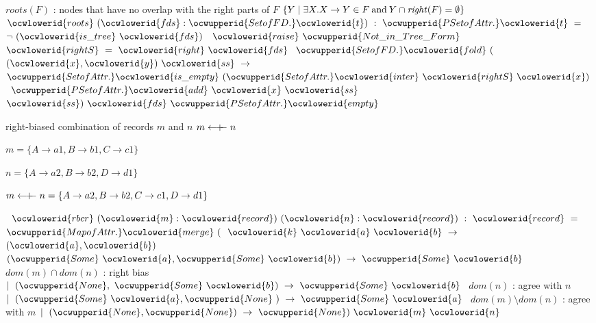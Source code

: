 \documentclass[12pt]{article}
\begin{document}
\ocwendcode{}\ocwindent{0.00em}
$roots(F)$ : nodes that have no overlap with the right parts of $F$ 
\ocweol
\ocwindent{0.00em}
$\{ Y \mid \exists X.X\to Y\in F \mathbin{\text{and}} Y \cap \mathit{right}(F)=\emptyset \}$ 
\ocweol
\label{rellens.ml:13759}%
\medskip
\ocwbegincode{}\ocwindent{0.00em}
~$\ocwlowerid{roots}~(\ocwlowerid{fds}:\ocwupperid{SetofFD.}\ocwlowerid{t})~:~\ocwupperid{PSetofAttr.}\ocwlowerid{t}~=$\ocweol
\ocwindent{1.50em}
~$\lnot{}~(\ocwlowerid{is\_tree}~\ocwlowerid{fds})~$~$\ocwlowerid{raise}~\ocwupperid{Not\_in\_Tree\_Form}~$\ocweol
\ocwindent{1.50em}
~$\ocwlowerid{rightS}~=~\ocwlowerid{right}~\ocwlowerid{fds}~$\ocweol
\ocwindent{1.50em}
$\ocwupperid{SetofFD.}\ocwlowerid{fold}~($~$(\ocwlowerid{x},\ocwlowerid{y})~\ocwlowerid{ss}~\rightarrow{}$\ocweol
\ocwindent{2.50em}
~$\ocwupperid{SetofAttr.}\ocwlowerid{is\_empty}~(\ocwupperid{SetofAttr.}\ocwlowerid{inter}~\ocwlowerid{rightS}~\ocwlowerid{x})~$\ocweol
\ocwindent{2.50em}
~$\ocwupperid{PSetofAttr.}\ocwlowerid{add}~\ocwlowerid{x}~\ocwlowerid{ss}~$\ocweol
\ocwindent{4.50em}
~$\ocwlowerid{ss})~\ocwlowerid{fds}~\ocwupperid{PSetofAttr.}\ocwlowerid{empty}$\medskip

\ocwendcode{}\ocwindent{0.00em}
right-biased combination of records $m$ and $n$ 
\ocweol
\ocwindent{0.00em}
$m \mathrel{\leftarrow\mkern-7mu+\mkern-7mu-} n$

  $m =          \{ A \to a1, B \to b1, C \to c1\}$

  $n =          \{ A \to a2, B \to b2,          D \to d1\}$

  $m \mathrel{\leftarrow\mkern-7mu+\mkern-7mu-} n  = \{ A \to a2, B \to b2, C \to c1,D \to d1\}$

 
\ocweol
\label{rellens.ml:14545}%
\medskip
\ocwbegincode{}\ocwindent{0.00em}
~$\ocwlowerid{rbcr}~(\ocwlowerid{m}:\ocwlowerid{record})~(\ocwlowerid{n}:\ocwlowerid{record})~:~\ocwlowerid{record}~=~$\ocweol
\ocwindent{1.00em}
$\ocwupperid{MapofAttr.}\ocwlowerid{merge}~($~$\ocwlowerid{k}~\ocwlowerid{a}~\ocwlowerid{b}~\rightarrow{}~$~$(\ocwlowerid{a},\ocwlowerid{b})~$\ocweol
\ocwindent{1.00em}
$(\ocwupperid{Some}~\ocwlowerid{a},\ocwupperid{Some}~\ocwlowerid{b})~\rightarrow{}~\ocwupperid{Some}~\ocwlowerid{b}~$\ocwbc{} $dom(m) \cap  dom(n)$ : right bias \ocwec{}\ocweol
\ocwindent{0.00em}
$\mid{}~(\ocwupperid{None},~\ocwupperid{Some}~\ocwlowerid{b})~\rightarrow{}~\ocwupperid{Some}~\ocwlowerid{b}~$\ocwbc{}              $dom(n)$ : agree with $n$ \ocwec{}\ocweol
\ocwindent{0.00em}
$\mid{}~(\ocwupperid{Some}~\ocwlowerid{a},\ocwupperid{None}~)~\rightarrow{}~\ocwupperid{Some}~\ocwlowerid{a}~$\ocwbc{} $dom(m)\setminus dom(n)$ : agree with $m$ \ocwec{}\ocweol
\ocwindent{0.00em}
$\mid{}~(\ocwupperid{None},\ocwupperid{None})~\rightarrow{}~\ocwupperid{None})~\ocwlowerid{m}~\ocwlowerid{n}$\medskip
\end{document}
